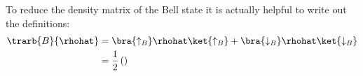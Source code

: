 To reduce the density matrix of the Bell state it is actually helpful to write out the definitions:
\begin{align}
\trarb{B}{\rhohat} &= \bra{\uparrow_B}\rhohat\ket{\uparrow_B}+\bra{\downarrow_B}\rhohat\ket{\downarrow_B}\\
&=\frac{1}{2}\left(\right)
\end{align}